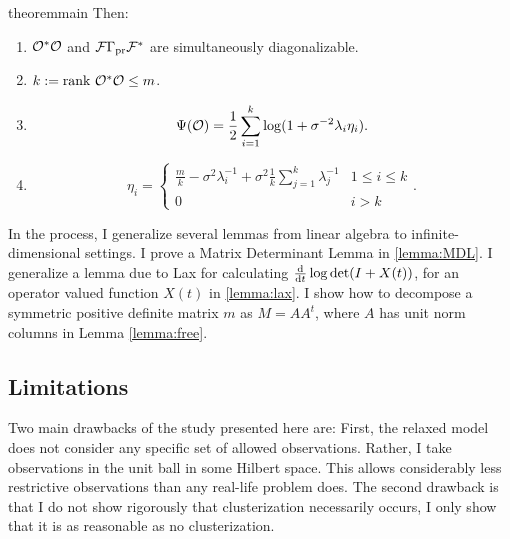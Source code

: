 \begin{restatable}{theorem}{main}
  Then:
  \begin{enumerate}
  \item $\mathcal{O}^*\mathcal{O}$ and $\mathcal{F}\Gamma_{\textup{pr}}\mathcal{F}^*$ are simultaneously
    diagonalizable.
  \item $k := \textup{rank}\  \mathcal{O}^*\mathcal{O} \leq m$.
  \item     
    \begin{equation*}
      \tar(\obs) = \frac12 \sum_{i=1}^{k} \log (1 + \sigma^{-2}\lambda_i\eta_i). %
    \end{equation*}
  \item
    \begin{equation*}
        \eta_i = \begin{cases}
          \frac{m}{k} - \sigma^2 \lambda_i^{-1} + \sigma^2 \frac{1}{k} \sum_{j=1}^k \lambda_j^{-1} & 1 \leq i \leq k \\
          0 & i > k 
        \end{cases}.
    \end{equation*}
  \end{enumerate}
\end{restatable}

In the process, I generalize several lemmas from linear algebra to
infinite-dimensional settings. I prove a Matrix Determinant Lemma in
\ref{lemma:MDL}. I generalize a lemma due to Lax \cite{Lax07} for
calculating $\frac{\text{\textup{d}}}{\text{\textup{d}} t} \log \det (I + X(t))$, for an
operator valued function $X(t)$ in \ref{lemma:lax}. I show how to
decompose a symmetric positive definite matrix $m$ as $M = AA^t$,
where $A$ has unit norm columns in Lemma \ref{lemma:free}.

\subsection{Limitations}\label{subsec:limitations}
Two main drawbacks of the study presented here are: First, the relaxed
model does not consider any specific set of allowed
observations. Rather, I take observations in the unit ball in some
Hilbert space. This allows considerably less restrictive observations
than any real-life problem does. The second drawback is that I do not
show rigorously that clusterization necessarily occurs, I only show
that it is as reasonable as no clusterization.


